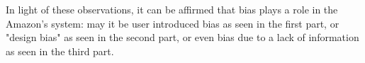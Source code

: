\documentclass[11pt]{article}
\begin{document}
In light of these observations, it can be affirmed that bias plays a role in the Amazon's system: may it be user introduced bias as seen in the first part, or "design bias" as seen in the second part, or even bias due to a lack of information as seen in the third part.
\newpage


\end{document}
